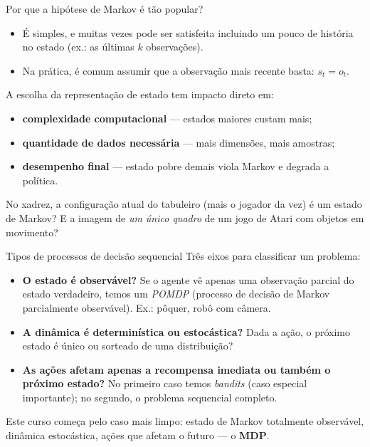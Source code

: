 \documentclass[aspectratio=169, 11pt]{beamer}
\newcommand{\paradiscussao}{\smallskip
  {\footnotesize\color{rlCinza}\itshape }}
\begin{document}
\begin{frame}{Por que a hipótese de Markov é tão popular?}
  \begin{itemize}
    \item É simples, e muitas vezes pode ser satisfeita incluindo um pouco
          de história no estado (ex.: as últimas $k$ observações).
    \item Na prática, é comum assumir que a observação mais recente basta:
          $s_t = o_t$.
  \end{itemize}

  \medskip
  A escolha da representação de estado tem impacto direto em:
  \begin{itemize}
    \item \textbf{complexidade computacional} — estados maiores custam
          mais;
    \item \textbf{quantidade de dados necessária} — mais dimensões, mais
          amostras;
    \item \textbf{desempenho final} — estado pobre demais viola Markov e
          degrada a política.
  \end{itemize}

  \begin{quizbox}{}
    No xadrez, a configuração atual do tabuleiro (mais o jogador da vez) é
    um estado de Markov? E a imagem de \emph{um único quadro} de um jogo de
    Atari com objetos em movimento?
  \end{quizbox}
  \paradiscussao
\end{frame}

\begin{frame}{Tipos de processos de decisão sequencial}
  Três eixos para classificar um problema:

  \medskip
  \begin{itemize}
    \item \textbf{O estado é observável?} Se o agente vê apenas uma
          observação parcial do estado verdadeiro, temos um
          \emph{POMDP} (processo de decisão de Markov parcialmente
          observável). Ex.: pôquer, robô com câmera.
    \item \textbf{A dinâmica é determinística ou estocástica?} Dada a ação,
          o próximo estado é único ou sorteado de uma distribuição?
    \item \textbf{As ações afetam apenas a recompensa imediata ou também o
          próximo estado?} No primeiro caso temos \emph{bandits}
          (caso especial importante); no segundo, o problema sequencial
          completo.
  \end{itemize}

  \medskip
  {\small\color{rlCinza} Este curso começa pelo caso mais limpo: estado de
  Markov totalmente observável, dinâmica estocástica, ações que afetam o
  futuro — o \textbf{MDP}.}
\end{frame}
\end{document}
